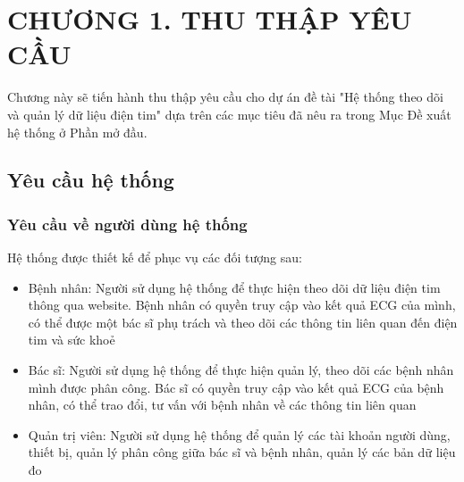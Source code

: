
\section*{CHƯƠNG 1. THU THẬP YÊU CẦU}
\setcounter{section}{1}
\setcounter{subsection}{0} %
\setcounter{table}{0} %
\setcounter{figure}{0} %
Chương này sẽ tiến hành thu thập yêu cầu cho dự án đề tài "Hệ thống theo dõi và quản lý dữ liệu điện tim" dựa trên các mục tiêu
đã nêu ra trong Mục Đề xuất hệ thống ở Phần mở đầu.

\subsection{Yêu cầu hệ thống}
\subsubsection{Yêu cầu về người dùng hệ thống}
Hệ thống được thiết kế để phục vụ các đối tượng sau:
\begin{adjustwidth}{1.5em}{}
\begin{itemize}
    \item Bệnh nhân: Người sử dụng hệ thống để thực hiện theo dõi dữ liệu điện tim thông qua website. Bệnh nhân có quyền truy cập vào kết quả ECG của mình, có thể được một bác sĩ phụ trách và theo dõi các thông tin liên quan đến điện tim và sức khoẻ
    \item Bác sĩ: Người sử dụng hệ thống để thực hiện quản lý, theo dõi các bệnh nhân mình được phân công. Bác sĩ có quyền truy cập vào kết quả ECG của bệnh nhân, có thể trao đổi, tư vấn với bệnh nhân về các thông tin liên quan
    \item Quản trị viên: Người sử dụng hệ thống để quản lý các tài khoản người dùng, thiết bị, quản lý phân công giữa bác sĩ và bệnh nhân, quản lý các bản dữ liệu đo
\end{itemize}
\end{adjustwidth}

